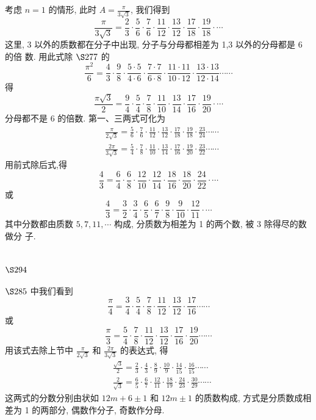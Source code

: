 考虑 $n=1$ 的情形, 此时 $A=\frac{\pi}{3 \sqrt{3}}$, 我们得到
\[
\frac{\pi}{3 \sqrt{3}}=\frac{2}{3} \cdot \frac{5}{6} \cdot \frac{7}{6} \cdot \frac{11}{12} \cdot \frac{13}{12} \cdot \frac{17}{18} \cdot \frac{19}{18} \cdot \cdots
\]
这里, 3 以外的质数都在分子中出现, 分子与分母都相差为 1,3 以外的分母都是 6 的倍 数. 用此式除 $\S 277$ 的
\[
\frac{\pi^{2}}{6}=\frac{4}{3} \cdot \frac{9}{8} \cdot \frac{5 \cdot 5}{4 \cdot 6} \cdot \frac{7 \cdot 7}{6 \cdot 8} \cdot \frac{11 \cdot 11}{10 \cdot 12} \cdot \frac{13 \cdot 13}{12 \cdot 14} \cdots \cdots
\]
得
\[
\frac{\pi \sqrt{3}}{2}=\frac{9}{4} \cdot \frac{5}{4} \cdot \frac{7}{8} \cdot \frac{11}{10} \cdot \frac{13}{14} \cdot \frac{17}{16} \cdot \frac{19}{20} \cdot \cdots
\]
分母都不是 6 的倍数. 第一、三两式可化为
\[
\begin{aligned}
& \frac{\pi}{2 \sqrt{3}}=\frac{5}{6} \cdot \frac{7}{6} \cdot \frac{11}{12} \cdot \frac{13}{12} \cdot \frac{17}{18} \cdot \frac{19}{18} \cdot \frac{23}{24} \cdots \cdots \\
& \frac{2 \pi}{3 \sqrt{3}}=\frac{5}{4} \cdot \frac{7}{8} \cdot \frac{11}{10} \cdot \frac{13}{14} \cdot \frac{17}{16} \cdot \frac{19}{20} \cdot \frac{23}{22} \cdots \cdots
\end{aligned}
\]
用前式除后式,得
\[
\frac{4}{3}=\frac{6}{4} \cdot \frac{6}{8} \cdot \frac{12}{10} \cdot \frac{12}{14} \cdot \frac{18}{16} \cdot \frac{18}{20} \cdot \frac{24}{22} \cdot \cdots
\]
或
\[
\frac{4}{3}=\frac{3}{2} \cdot \frac{3}{4} \cdot \frac{6}{5} \cdot \frac{6}{7} \cdot \frac{9}{8} \cdot \frac{9}{10} \cdot \frac{12}{11} \cdot \cdots
\]
其中分数都由质数 $5,7,11, \cdots$ 构成, 分质数为相差为 1 的两个数, 被 3 除得尽的数做分 子.

\section{$\S 294$}

$\S 285$ 中我们看到
\[
\frac{\pi}{4}=\frac{3}{4} \cdot \frac{5}{4} \cdot \frac{7}{8} \cdot \frac{11}{12} \cdot \frac{13}{12} \cdot \frac{17}{16} \cdots \cdots
\]
或
\[
\frac{\pi}{3}=\frac{5}{4} \cdot \frac{7}{8} \cdot \frac{11}{12} \cdot \frac{13}{12} \cdot \frac{17}{16} \cdot \frac{19}{20} \cdots \cdots
\]
用该式去除上节中 $\frac{\pi}{2 \sqrt{3}}$ 和 $\frac{2 \pi}{3 \sqrt{3}}$ 的表达式, 得
\[
\begin{aligned}
& \frac{\sqrt{3}}{2}=\frac{2}{3} \cdot \frac{4}{3} \cdot \frac{8}{9} \cdot \frac{10}{9} \cdot \frac{14}{15} \cdot \frac{16}{15} \cdots \cdots \\
& \frac{2}{\sqrt{3}}=\frac{6}{5} \cdot \frac{6}{7} \cdot \frac{12}{11} \cdot \frac{18}{19} \cdot \frac{24}{23} \cdot \frac{30}{29} \cdots \cdots
\end{aligned}
\]
这两式的分数分别由状如 $12 m+6 \pm 1$ 和 $12 m \pm 1$ 的质数构成, 方式是分质数成相差为 1 的两部分, 偶数作分子, 奇数作分母.

